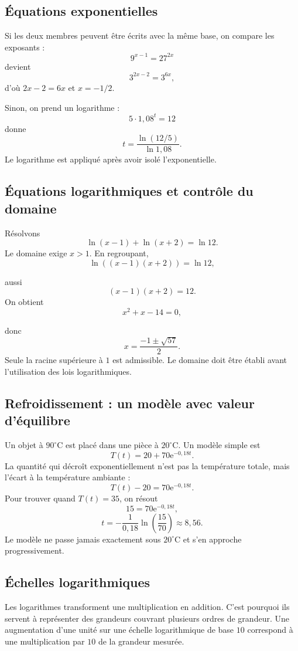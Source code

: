 \documentclass[12pt,a4paper,openany]{book}
\newcommand{\e}{\mathrm{e}}
\begin{document}
\subsection{Équations exponentielles}

Si les deux membres peuvent être écrits avec la même base, on compare les exposants :
\[
9^{x-1}=27^{2x}
\]
devient
\[
3^{2x-2}=3^{6x},
\]
d'où $2x-2=6x$ et $x=-1/2$.

Sinon, on prend un logarithme :
\[
5\cdot1{,}08^t=12
\]
donne
\[
t=\frac{\ln(12/5)}{\ln1{,}08}.
\]
Le logarithme est appliqué après avoir isolé l'exponentielle.

\subsection{Équations logarithmiques et contrôle du domaine}

Résolvons
\[
\ln(x-1)+\ln(x+2)=\ln12.
\]
Le domaine exige $x>1$. En regroupant,
\[
\ln((x-1)(x+2))=\ln12,
\]

aussi
\[
(x-1)(x+2)=12.
\]
On obtient
\[
x^2+x-14=0,
\]

donc
\[
x=\frac{-1\pm\sqrt{57}}2.
\]
Seule la racine supérieure à $1$ est admissible. Le domaine doit être établi avant l'utilisation des lois logarithmiques.

\subsection{Refroidissement : un modèle avec valeur d'équilibre}

Un objet à $90^\circ$C est placé dans une pièce à $20^\circ$C. Un modèle simple est
\[
T(t)=20+70\e^{-0{,}18t}.
\]
La quantité qui décroît exponentiellement n'est pas la température totale, mais l'écart à la température ambiante :
\[
T(t)-20=70\e^{-0{,}18t}.
\]
Pour trouver quand $T(t)=35$, on résout
\[
15=70\e^{-0{,}18t},
\]
\[
t=-\frac1{0{,}18}\ln\left(\frac{15}{70}\right)\approx8{,}56.
\]
Le modèle ne passe jamais exactement sous $20^\circ$C et s'en approche progressivement.

\subsection{Échelles logarithmiques}

Les logarithmes transforment une multiplication en addition. C'est pourquoi ils servent à représenter des grandeurs couvrant plusieurs ordres de grandeur. Une augmentation d'une unité sur une échelle logarithmique de base $10$ correspond à une multiplication par $10$ de la grandeur mesurée.
\end{document}
